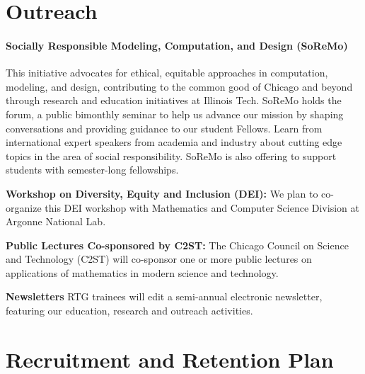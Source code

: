 \documentclass[11pt]{NSFamsart}
\newcommand{\bfparagraph}[1]{\paragraph{\textbf{\textup{#1}}}}
\begin{document}
\section{Outreach}

\bfparagraph{Socially Responsible Modeling, Computation, and Design
(SoReMo)}
This initiative advocates for ethical, equitable approaches in computation,
modeling, and design, contributing to the common good of Chicago and
beyond through research and education initiatives at Illinois Tech.
SoReMo holds the forum,  a public bimonthly seminar to help us advance
our mission by shaping conversations and providing guidance to our
student Fellows. Learn from international expert speakers from academia
and industry about cutting edge topics in the area of social responsibility.
SoReMo is also offering to support students with semester-long fellowships.   

\noindent
\textbf{Workshop on Diversity, Equity and Inclusion (DEI):}
We plan to co-organize this DEI workshop with Mathematics and Computer Science Division at   Argonne National Lab. 

\noindent
\textbf{Public Lectures Co-sponsored by  C2ST:}  The Chicago Council on Science and Technology (C2ST) will co-sponsor   one or more public lectures on applications   of mathematics in modern science and technology.

\noindent
\textbf{Newsletters} 
RTG trainees will edit a semi-annual electronic newsletter, 
featuring our education, research  and outreach  activities. 

\section{Recruitment and Retention Plan}
\end{document}
